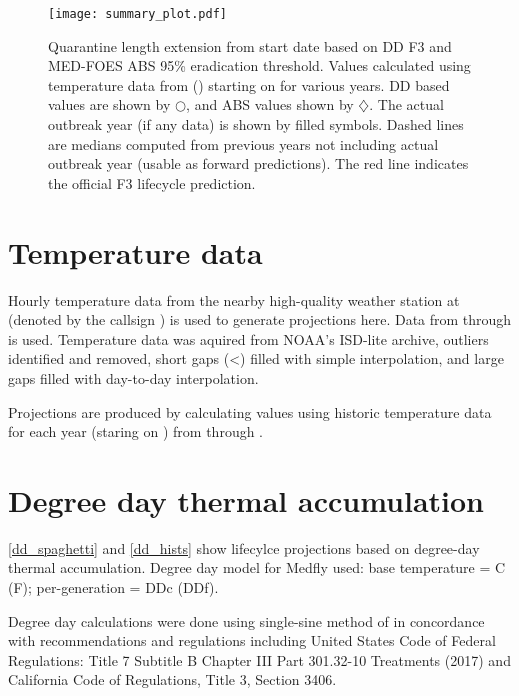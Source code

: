 \documentclass[10pt]{article}
\begin{document}
\begin{figure}[H]
\centering
\texttt{[image: summary\_plot.pdf]}
\caption{
\label{summary_plot}
Quarantine length extension from start date based on DD F3 and MED-FOES ABS 95\% eradication threshold.
Values calculated using temperature data from \VarStationDescription (\VarStation) starting on \VarStartDOY 
for various years.  DD based values are shown by $\bigcirc$, and ABS values shown by $\diamondsuit$.  
The actual outbreak year (if any data) is shown by filled symbols.
Dashed lines are medians computed from previous years not including actual outbreak year (usable as forward predictions).
The red line indicates the official F3 lifecycle prediction.
}
\end{figure}

\section*{Temperature data}

Hourly temperature data from the nearby high-quality weather station at 
\VarStationDescription (denoted by the callsign \VarStation) is used to generate
projections here.
Data from \VarTempStartYear through \VarEndDateOfTempData is used.
Temperature data was aquired from NOAA's ISD-lite archive,
outliers identified and removed, 
short gaps (\textless \VarLargeGapSize [HH:MM:SS]) filled with simple interpolation, 
and large gaps filled with day-to-day interpolation.

Projections are produced by calculating values using historic temperature data for 
each year (staring on \VarStartDOY) from \VarTempStartYear through \VarTempEndYear.


\section*{Degree day thermal accumulation}

\autoref{dd_spaghetti} and \autoref{dd_hists} show lifecylce projections based on 
degree-day thermal accumulation.
Degree day model for Medfly used:
base temperature = \VarDDBaseTempC \degree C (\VarDDBaseTempF \degree F);
per-generation = \VarGenDDc DDc (\VarGenDDf DDf).

Degree day calculations were done using single-sine method of \citet{ECY:ECY1969503514}
in concordance with recommendations and regulations including 
United States Code of Federal Regulations: Title 7 Subtitle B Chapter III Part 301.32-10 Treatments (2017)\cite{US-301.32-10}
and California Code of Regulations, Title 3, Section 3406\cite{3-CA-ADC-3406}.
\end{document}
